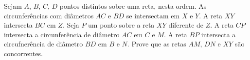 Sejam $A$, $B$, $C$, $D$ pontos distintos sobre uma reta, nesta ordem. As circunferências com diâmetros $AC$ e $BD$ se intersectam em $X$ e $Y$. A reta $XY$ intersecta $BC$ em $Z$.
Seja $P$ um ponto sobre a reta $XY$ diferente de $Z$. A reta $CP$ intersecta a circunferência de diâmetro $AC$ em $C$ e $M$. A reta $BP$ intersecta a circufnerência de diâmetro $BD$ em $B$ e $N$.
Prove que as retas $AM$, $DN$ e $XY$ são concorrentes.
